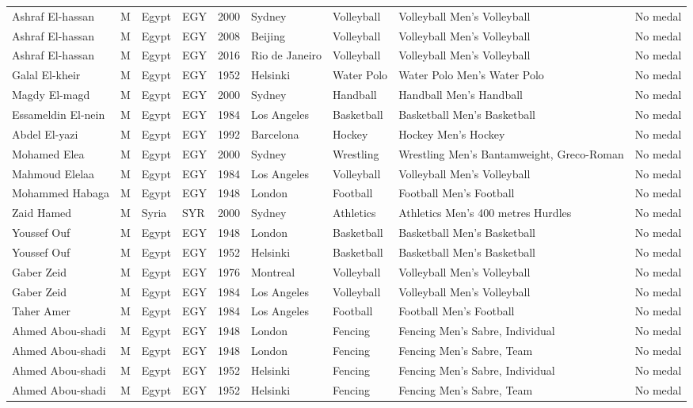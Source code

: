 \documentclass{article}%
\begin{document}
\begin{longtable}{l l l l l l l l l}
Ashraf El{-}hassan&M&Egypt&EGY&2000&Sydney&Volleyball&Volleyball Men's Volleyball&No medal\\%
Ashraf El{-}hassan&M&Egypt&EGY&2008&Beijing&Volleyball&Volleyball Men's Volleyball&No medal\\%
Ashraf El{-}hassan&M&Egypt&EGY&2016&Rio de Janeiro&Volleyball&Volleyball Men's Volleyball&No medal\\%
Galal El{-}kheir&M&Egypt&EGY&1952&Helsinki&Water Polo&Water Polo Men's Water Polo&No medal\\%
Magdy El{-}magd&M&Egypt&EGY&2000&Sydney&Handball&Handball Men's Handball&No medal\\%
Essameldin El{-}nein&M&Egypt&EGY&1984&Los Angeles&Basketball&Basketball Men's Basketball&No medal\\%
Abdel El{-}yazi&M&Egypt&EGY&1992&Barcelona&Hockey&Hockey Men's Hockey&No medal\\%
Mohamed Elea&M&Egypt&EGY&2000&Sydney&Wrestling&Wrestling Men's Bantamweight, Greco{-}Roman&No medal\\%
Mahmoud Elelaa&M&Egypt&EGY&1984&Los Angeles&Volleyball&Volleyball Men's Volleyball&No medal\\%
Mohammed Habaga&M&Egypt&EGY&1948&London&Football&Football Men's Football&No medal\\%
Zaid Hamed&M&Syria&SYR&2000&Sydney&Athletics&Athletics Men's 400 metres Hurdles&No medal\\%
Youssef Ouf&M&Egypt&EGY&1948&London&Basketball&Basketball Men's Basketball&No medal\\%
Youssef Ouf&M&Egypt&EGY&1952&Helsinki&Basketball&Basketball Men's Basketball&No medal\\%
Gaber Zeid&M&Egypt&EGY&1976&Montreal&Volleyball&Volleyball Men's Volleyball&No medal\\%
Gaber Zeid&M&Egypt&EGY&1984&Los Angeles&Volleyball&Volleyball Men's Volleyball&No medal\\%
Taher Amer&M&Egypt&EGY&1984&Los Angeles&Football&Football Men's Football&No medal\\%
Ahmed Abou{-}shadi&M&Egypt&EGY&1948&London&Fencing&Fencing Men's Sabre, Individual&No medal\\%
Ahmed Abou{-}shadi&M&Egypt&EGY&1948&London&Fencing&Fencing Men's Sabre, Team&No medal\\%
Ahmed Abou{-}shadi&M&Egypt&EGY&1952&Helsinki&Fencing&Fencing Men's Sabre, Individual&No medal\\%
Ahmed Abou{-}shadi&M&Egypt&EGY&1952&Helsinki&Fencing&Fencing Men's Sabre, Team&No medal\\%

\end{longtable}
\end{document}
